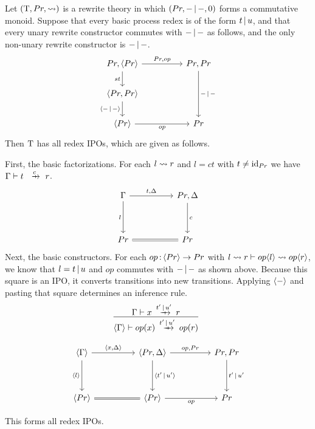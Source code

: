 \documentclass{article}
\begin{document}
\begin{theorem}
    Let $(\mathrm{T},Pr,\rightsquigarrow)$ is a rewrite theory in which $(Pr,-\,|\, -,0)$ forms a commutative monoid. Suppose that every basic process redex is of the form $t\,|\, u$, and that every unary rewrite constructor commutes with $-\,|\, -$ as follows, and the only non-unary rewrite constructor is $-\,|\, -$.
    \[\begin{tikzcd}
    	{Pr, \brk{Pr}} && {Pr,Pr} \\
    	{\brk{Pr,Pr}} \\
    	{\brk{Pr}} && Pr
    	\arrow["{Pr,op}", from=1-1, to=1-3]
    	\arrow["st"', from=1-1, to=2-1]
    	\arrow["{-\pr -}", from=1-3, to=3-3]
    	\arrow["{\brk{-\pr -}}"', from=2-1, to=3-1]
    	\arrow["op"', from=3-1, to=3-3]
    \end{tikzcd}\]
    Then $\mathrm{T}$ has all redex IPOs, which are given as follows. 

    First, the basic factorizations. For each $l\rightsquigarrow r$ and $l=ct$ with $t\neq \mathrm{id}_{Pr}$ we have $\Gamma\vdash t\xr{c} r$.
    \[\begin{tikzcd}
    	\Gamma && {Pr,\Delta} \\
    	\\
    	Pr && Pr
    	\arrow["{t,\Delta}", from=1-1, to=1-3]
    	\arrow["l"', from=1-1, to=3-1]
    	\arrow["c", from=1-3, to=3-3]
    	\arrow[equals, from=3-1, to=3-3]
    \end{tikzcd}\]
    Next, the basic constructors. For each $op\,{:}\, \langle Pr\rangle\to Pr$ with $l\rightsquigarrow r\vdash op\langle l\rangle\rightsquigarrow op\langle r\rangle$, we know that $l=t\,|\, u$ and $op$ commutes with $-\,|\, -$ as shown above. Because this square is an IPO, it converts transitions into new transitions. Applying $\langle -\rangle$ and pasting that square determines an inference rule.
    \[\infr{\Gamma\vdash x\xr{t'\pr u'} r}{\brk{\Gamma} \vdash op(x)\xr{t'\pr u'} op(r)}\]
    
    \[\begin{tikzcd}
    	{\brk{\Gamma}} && {\brk{Pr,\Delta}} && {Pr,Pr} \\ \\
    	{\brk{Pr}} && {\brk{Pr}} && Pr
        \arrow["\brk{t'\pr u'}", from=1-3, to=3-3]
    	\arrow["{\brk{x,\Delta}}", from=1-1, to=1-3]
    	\arrow["{\brk{l}}"', from=1-1, to=3-1]
    	\arrow["{op,Pr}", from=1-3, to=1-5]
    	\arrow["{t'\pr u'}", from=1-5, to=3-5]
    	\arrow[equals, from=3-1, to=3-3]
    	\arrow["op"', from=3-3, to=3-5]
    \end{tikzcd}\]

    This forms all redex IPOs.
\end{theorem}
\end{document}
